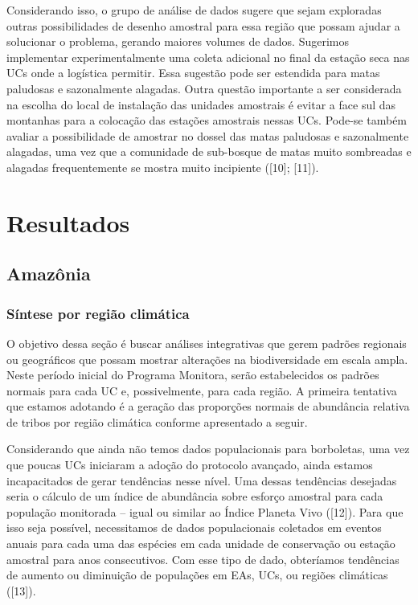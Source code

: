 \documentclass[
  letterpaper,
]{scrbook}
\begin{document}
Considerando isso, o grupo de análise de dados sugere que sejam
exploradas outras possibilidades de desenho amostral para essa região
que possam ajudar a solucionar o problema, gerando maiores volumes de
dados. Sugerimos implementar experimentalmente uma coleta adicional no
final da estação seca nas UCs onde a logística permitir. Essa sugestão
pode ser estendida para matas paludosas e sazonalmente alagadas. Outra
questão importante a ser considerada na escolha do local de instalação
das unidades amostrais é evitar a face sul das montanhas para a
colocação das estações amostrais nessas UCs. Pode-se também avaliar a
possibilidade de amostrar no dossel das matas paludosas e sazonalmente
alagadas, uma vez que a comunidade de sub-bosque de matas muito
sombreadas e alagadas frequentemente se mostra muito incipiente
({[}10{]}; {[}11{]}).

\section{Resultados}\label{resultados-1}

\subsection{Amazônia}\label{amazuxf4nia}

\subsubsection{Síntese por região
climática}\label{suxedntese-por-regiuxe3o-climuxe1tica}

O objetivo dessa seção é buscar análises integrativas que gerem padrões
regionais ou geográficos que possam mostrar alterações na biodiversidade
em escala ampla. Neste período inicial do Programa Monitora, serão
estabelecidos os padrões normais para cada UC e, possivelmente, para
cada região. A primeira tentativa que estamos adotando é a geração das
proporções normais de abundância relativa de tribos por região climática
conforme apresentado a seguir.

Considerando que ainda não temos dados populacionais para borboletas,
uma vez que poucas UCs iniciaram a adoção do protocolo avançado, ainda
estamos incapacitados de gerar tendências nesse nível. Uma dessas
tendências desejadas seria o cálculo de um índice de abundância sobre
esforço amostral para cada população monitorada -- igual ou similar ao
Índice Planeta Vivo ({[}12{]}). Para que isso seja possível,
necessitamos de dados populacionais coletados em eventos anuais para
cada uma das espécies em cada unidade de conservação ou estação amostral
para anos consecutivos. Com esse tipo de dado, obteríamos tendências de
aumento ou diminuição de populações em EAs, UCs, ou regiões climáticas
({[}13{]}).
\end{document}
